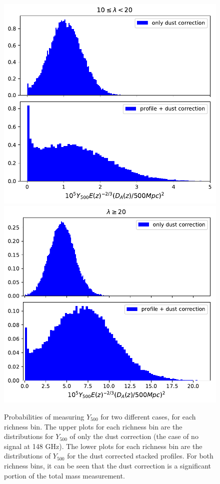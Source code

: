 \documentclass[a4paper,fleqn,usenatbib]{mnras}
\begin{document}
\begin{figure}
  \centering
  \includegraphics[width= \columnwidth] {chains2y500_10_20.pdf}
  \includegraphics[width= \columnwidth] {chains2y500_gt20.pdf}
  \caption{Probabilities of measuring $Y_{500}$ for two different cases, for each richness bin. The upper plots for each richness bin are the distributions for $Y_{500}$ of only the dust correction (the case of no signal at 148 GHz). The lower plots for each richness bin are the distributions of $Y_{500}$ for the dust corrected stacked profiles. For both richness bins, it can be seen that the dust correction is a significant portion of the total mass measurement.}  
  \label{fig:y500dist}
\end{figure}
\end{document}
